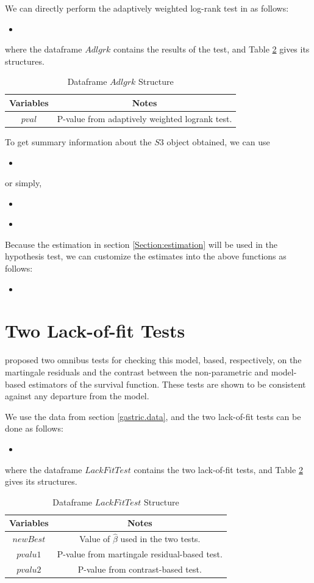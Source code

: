 \documentclass[12pt]{article}
\newcommand{\insertcode}[2]{\begin{itemize}\item[]\end{itemize}} %
\begin{document}
We can directly perform the adaptively weighted log-rank test in \cite{yang2009improved} as follows:
\insertcode{"Scripts/code18.pl"}{Performing the adaptively weighted log-rank test.}
where the dataframe $Adlgrk$ contains the results of the test, and Table \ref{Tab:IntervalBandsStructure} gives its structures.

\begin{table}[!h]
\renewcommand{\arraystretch}{1.3}
\caption{Dataframe $Adlgrk$ Structure} \label{Tab:AdlgrkStructure} \centering
\begin{tabular}{|c||c|}
  \hline
  Variables & Notes  \\
  \hline
  $pval$ & P-value from adaptively weighted logrank test. \\
  \hline
\end{tabular}
\end{table}

To get summary information about the $S3$ object obtained, we can use

\insertcode{"Scripts/code19.pl"}{}
or simply,
\insertcode{"Scripts/code19s.pl"}{Summarizing results of the adaptively weighted logrank test.}
\insertcode{"Scripts/result19.pl"}{Results of scripts.}

Because the estimation in section \ref{Section:estimation} will be used in the hypothesis test, we can customize the estimates into the above functions as follows:
\insertcode{"Scripts/code18 - 2.pl"}{Performing confidence intervals and bands estimation with customized estimates.}

\section{Two Lack-of-fit Tests}\label{Section.LacTest}
\cite{yang2012checking} proposed two omnibus tests for checking this
model, based, respectively, on the martingale residuals and the contrast between
the non-parametric and model-based estimators of the survival function.
These tests are shown to be consistent against any departure from the
model.

We use the data from section \ref{gastric.data}, and the two lack-of-fit tests can be done as follows:
\insertcode{"Scripts/code22.pl"}{Performing the two lack-of-fit tests.}
where the dataframe $LackFitTest$ contains the two lack-of-fit tests, and Table \ref{Tab:IntervalBandsStructure} gives its structures.

\begin{table}[!h]
\renewcommand{\arraystretch}{1.3}
\caption{Dataframe $LackFitTest$ Structure} \label{Tab:IntervalBandsStructure} \centering
\begin{tabular}{|c||c|}
  \hline
  Variables & Notes  \\
  \hline
  $newBest$ & Value of $\hat{\beta}$ used in the two tests.\\
  $pvalu1$ & P-value from martingale residual-based test. \\
  $pvalu2$ & P-value from contrast-based test. \\
  \hline
\end{tabular}
\end{table}
\end{document}
